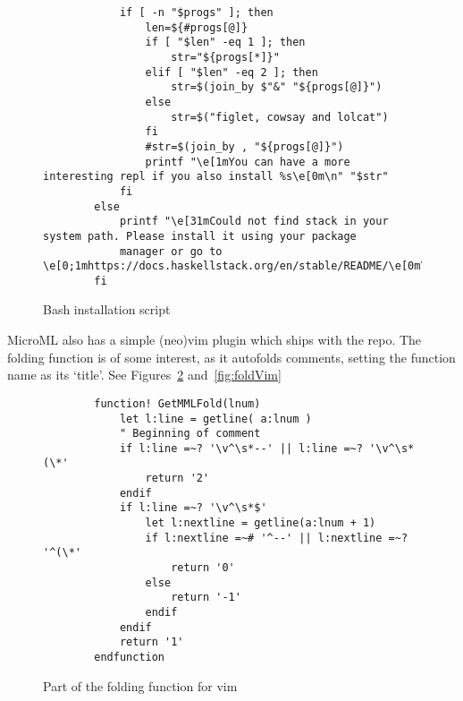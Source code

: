 \begin{figure}
\begin{verbatim}
            if [ -n "$progs" ]; then
                len=${#progs[@]}
                if [ "$len" -eq 1 ]; then
                    str="${progs[*]}"
                elif [ "$len" -eq 2 ]; then
                    str=$(join_by $"&" "${progs[@]}")
                else 
                    str=$("figlet, cowsay and lolcat")
                fi
                #str=$(join_by , "${progs[@]}")
                printf "\e[1mYou can have a more interesting repl if you also install %s\e[0m\n" "$str"
            fi
        else 
            printf "\e[31mCould not find stack in your system path. Please install it using your package
            manager or go to \e[0;1mhttps://docs.haskellstack.org/en/stable/README/\e[0m\n"
        fi
    \end{verbatim}
    \caption{Bash installation script}
\label{fig:installation}
\end{figure}
MicroML also has a simple (neo)vim plugin which ships with the repo. The folding function is of some
interest, as it autofolds comments, setting the function name as its `title'. See
Figures~\ref{fig:fold} and~\ref{fig:foldVim}
\begin{figure}
    \begin{verbatim}
        function! GetMMLFold(lnum) 
            let l:line = getline( a:lnum )
            " Beginning of comment
            if l:line =~? '\v^\s*--' || l:line =~? '\v^\s*(\*'
                return '2'
            endif
            if l:line =~? '\v^\s*$'
                let l:nextline = getline(a:lnum + 1)
                if l:nextline =~# '^--' || l:nextline =~? '^(\*'
                    return '0'
                else
                    return '-1'
                endif
            endif
            return '1'
        endfunction 
    \end{verbatim}
    \caption{Part of the folding function for vim}
\label{fig:fold}
\end{figure}
